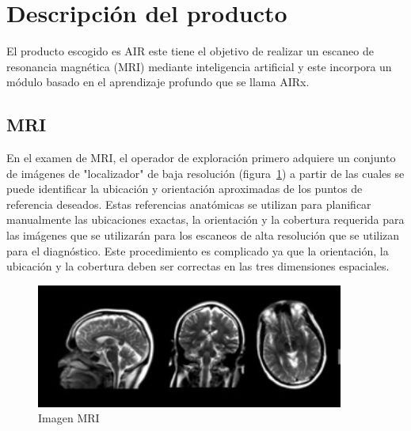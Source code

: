 

\section{Descripción del producto}
El producto escogido es AIR este tiene el objetivo de realizar un escaneo de resonancia magnética (MRI) mediante inteligencia artificial y este incorpora un módulo basado en el aprendizaje profundo que se llama AIRx.
\cite{noauthor_magnetic_nodate} 
    \subsection{MRI} %
    En el examen de MRI, el operador de exploración primero adquiere un conjunto de imágenes de "localizador" de baja resolución (figura~\ref{fig:resonancia}) a partir de las cuales se puede identificar la ubicación y orientación aproximadas de los puntos de referencia deseados. Estas referencias anatómicas se utilizan para planificar manualmente las ubicaciones exactas, la orientación y la cobertura requerida para las imágenes que se utilizarán para los escaneos de alta resolución que se utilizan para el diagnóstico. Este procedimiento es complicado ya que la orientación, la ubicación y la cobertura deben ser correctas en las tres dimensiones
     espaciales.
     
     \begin{figure}[H]
        \centering
        \includegraphics[width=0.9\textwidth]{resonancia.png}
        \caption{Imagen MRI}%
        \label{fig:resonancia}
     \end{figure}
    
